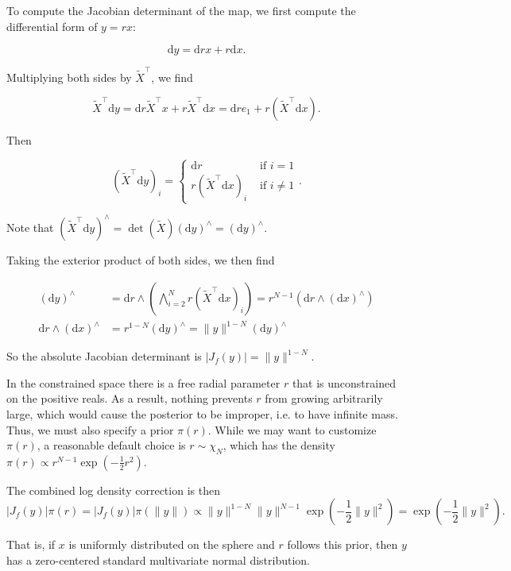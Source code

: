 \documentclass[11pt]{article}
\newcommand{\abs}[1]{\left| #1 \right|}
\newcommand{\absdet}[1]{\abs{#1}}
\newcommand{\dv}[1]{\mathrm{d}{#1}}
\begin{document}
To compute the Jacobian determinant of the map, we first compute the differential form of $y=rx$:

\[\dv{y} = \dv{r} x + r \dv{x}.\]

Multiplying both sides by $\tilde{X}^\top$, we find

\[
    \tilde{X}^\top \dv{y} = \dv{r} \tilde{X}^\top x + r \tilde{X}^\top \dv{x} = \dv{r} e_1 + r (\tilde{X}^\top \dv{x}).
    \]

Then

\[
    (\tilde{X}^\top \dv{y})_i = \begin{cases}
        \dv{r} & \text{ if } i = 1 \\
        r (\tilde{X}^\top \dv{x})_i & \text{ if } i \ne 1
    \end{cases}.
\]

Note that $(\tilde{X}^\top \dv{y})^\wedge = \det({\tilde{X}}) (\dv{y})^\wedge = (\dv{y})^\wedge$.

Taking the exterior product of both sides, we then find

\[
\begin{aligned}
    (\dv{y})^\wedge &= \dv{r} \wedge \left(\bigwedge_{i=2}^N r (\tilde{X}^\top \dv{x})_i \right) = r^{N-1} \left(\dv{r} \wedge (\dv{x})^\wedge\right)\\
    \dv{r} \wedge (\dv{x})^\wedge &= r^{1-N} (\dv{y})^\wedge = \lVert y \rVert^{1-N} (\dv{y})^\wedge
\end{aligned}
\]

So the absolute Jacobian determinant is $\absdet{J_f(y)} = \lVert y \rVert^{1-N}$.

In the constrained space there is a free radial parameter $r$ that is unconstrained on the positive reals.
As a result, nothing prevents $r$ from growing arbitrarily large, which would cause the posterior to be improper, i.e. to have infinite mass.
Thus, we must also specify a prior $\pi(r)$.
While we may want to customize $\pi(r)$, a reasonable default choice is $r \sim \chi_N$, which has the density $\pi(r) \propto r^{N-1} \exp\left(-\frac{1}{2}r^2\right) $.

The combined log density correction is then
\[
  \absdet{J_f(y)} \pi(r) = \absdet{J_f(y)} \pi(\lVert y \rVert) \propto \lVert y \rVert^{1-N} \lVert y \rVert^{N-1} \exp\left(-\frac{1}{2}\lVert y \rVert^2\right) = \exp\left(-\frac{1}{2}\lVert y \rVert^2\right).
\]

That is, if $x$ is uniformly distributed on the sphere and $r$ follows this prior, then $y$ has a zero-centered standard multivariate normal distribution.
\end{document}
